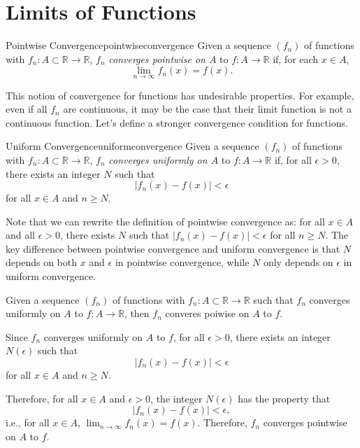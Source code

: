\chapter{Limits of Functions}


\begin{defn}{Pointwise Convergence}{pointwiseconvergence}
  Given a sequence \((f_n)\) of functions with \(f_n \colon A \subset \mathbb{R} \to \mathbb{R}\), \(f_n\) \emph{converges pointwise on \(A\)} to \(f\colon A \to \mathbb{R}\) if, for each \(x \in A\), \[ \lim_{n\to\infty} f_n(x) = f(x).\]
\end{defn}

This notion of convergence for functions has undesirable properties. For example, even if all \(f_n\) are continuous, it may be the case that their limit function is not a continuous function. Let's define a stronger convergence condition for functions.

\begin{defn}{Uniform Convergence}{uniformconvergence}
  Given a sequence \((f_n)\) of functions with \(f_n \colon A \subset \mathbb{R} \to \mathbb{R}\), \(f_n\) \emph{converges uniformly on \(A\)} to \(f \colon A \to \mathbb{R}\) if, for all \(\epsilon > 0\), there exists an integer \(N\) such that \[ |f_n(x) - f(x) | < \epsilon \] for all \(x \in A\) and \(n \geq N\).
\end{defn}

Note that we can rewrite the definition of pointwise convergence as: for all \(x \in A\) and all \(\epsilon > 0\), there exists \(N\) such that \(|f_n(x) - f(x)| < \epsilon\) for all \(n \geq N\). The key difference between pointwise convergence and uniform convergence is that  \(N\) depends on both \(x\) and \(\epsilon\) in pointwise convergence, while  \(N\) only depends on \(\epsilon\) in uniform convergence.

\begin{prop}{}{}
  Given a sequence \((f_n)\) of functions with \(f_n \colon A \subset \mathbb{R} \to \mathbb{R}\) such that \(f_n\) converges uniformly on \(A\) to \(f\colon A \to \mathbb{R}\), then \(f_n\) converes poiwise on \(A\) to \(f\).
\end{prop}
\begin{dem}{}{}
  Since \(f_n\) converges uniformly on \(A\) to \(f\), for all \(\epsilon > 0\), there exists an integer \(N(\epsilon)\) such that \[ |f_n(x) - f(x) | < \epsilon \] for all \(x \in A\) and \(n \geq N\).

  Therefore, for all \(x \in A\) and \(\epsilon > 0\), the integer \(N(\epsilon)\) has the property that \[ | f_n(x) - f(x) | < \epsilon,\] i.e., for all \(x \in A\),  \(\lim_{n \to\infty} f_n(x) = f(x)\). Therefore, \(f_n\) converges pointwise on \(A\) to \(f\).
\end{dem}

